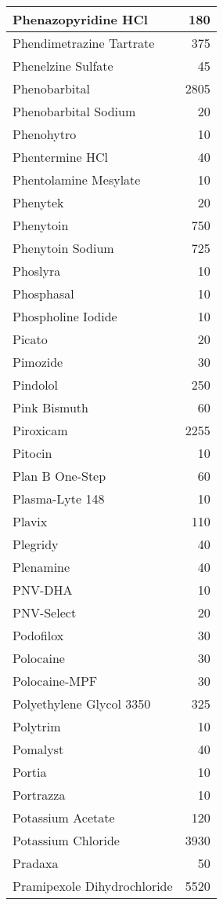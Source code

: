 \documentclass[
]{article}
\begin{document}
\begin{table}
\begin{tabular}[t]{l|r}
\hline
Phenazopyridine HCl & 180\\
\hline
Phendimetrazine Tartrate & 375\\
\hline
Phenelzine Sulfate & 45\\
\hline
Phenobarbital & 2805\\
\hline
Phenobarbital Sodium & 20\\
\hline
Phenohytro & 10\\
\hline
Phentermine HCl & 40\\
\hline
Phentolamine Mesylate & 10\\
\hline
Phenytek & 20\\
\hline
Phenytoin & 750\\
\hline
Phenytoin Sodium & 725\\
\hline
Phoslyra & 10\\
\hline
Phosphasal & 10\\
\hline
Phospholine Iodide & 10\\
\hline
Picato & 20\\
\hline
Pimozide & 30\\
\hline
Pindolol & 250\\
\hline
Pink Bismuth & 60\\
\hline
Piroxicam & 2255\\
\hline
Pitocin & 10\\
\hline
Plan B One-Step & 60\\
\hline
Plasma-Lyte 148 & 10\\
\hline
Plavix & 110\\
\hline
Plegridy & 40\\
\hline
Plenamine & 40\\
\hline
PNV-DHA & 10\\
\hline
PNV-Select & 20\\
\hline
Podofilox & 30\\
\hline
Polocaine & 30\\
\hline
Polocaine-MPF & 30\\
\hline
Polyethylene Glycol 3350 & 325\\
\hline
Polytrim & 10\\
\hline
Pomalyst & 40\\
\hline
Portia & 10\\
\hline
Portrazza & 10\\
\hline
Potassium Acetate & 120\\
\hline
Potassium Chloride & 3930\\
\hline
Pradaxa & 50\\
\hline
Pramipexole Dihydrochloride & 5520\\

\end{tabular}
\end{table}
\end{document}

